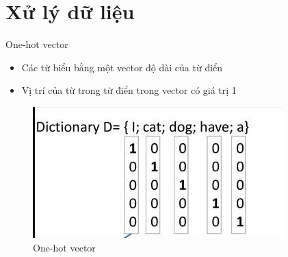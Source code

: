 \documentclass[compress]{beamer}
\begin{document}
\section{Xử lý dữ liệu}
\begin{frame}{One-hot vector}
\begin{itemize}
\item Các từ biểu bằng một vector độ dài của từ điển
\item Vị trí của từ trong từ điển trong vector có giá trị 1
\end{itemize}
\begin{figure}
\includegraphics[scale=0.5]{one_hot_vector.jpg}
\caption{One-hot vector}
\end{figure}
\end{frame}
\end{document}
